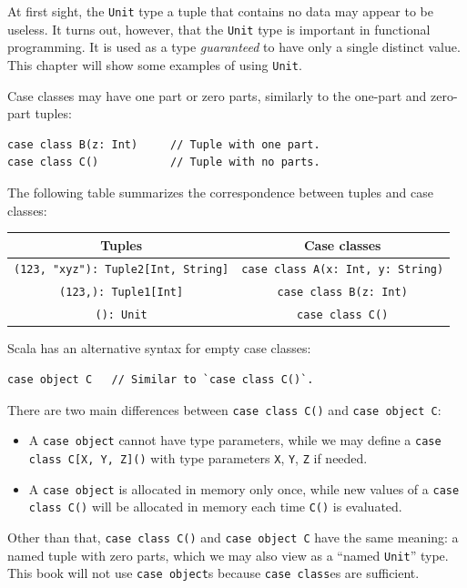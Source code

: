 At first sight, the \lstinline!Unit! type \textemdash{} a tuple that
contains no data \textemdash{} may appear to be useless. It turns
out, however, that the \lstinline!Unit! type is important in functional
programming. It is used as a type \emph{guaranteed} to have only a
single distinct value. This chapter will show some examples of using
\lstinline!Unit!.

Case classes may have one part or zero parts, similarly to the one-part
and zero-part tuples:
\begin{lstlisting}
case class B(z: Int)     // Tuple with one part.
case class C()           // Tuple with no parts.
\end{lstlisting}

The following table summarizes the correspondence between tuples and
case classes:
\begin{center}
\begin{tabular}{|c|c|}
\hline 
\textbf{\small{}Tuples} & \textbf{\small{}Case classes}\tabularnewline
\hline 
\hline 
{\small{}}\lstinline!(123, "xyz"): Tuple2[Int, String]! & {\small{}}\lstinline!case class A(x: Int, y: String)!\tabularnewline
\hline 
{\small{}}\lstinline!(123,): Tuple1[Int]! & {\small{}}\lstinline!case class B(z: Int)!\tabularnewline
\hline 
{\small{}}\lstinline!(): Unit! & {\small{}}\lstinline!case class C()!\tabularnewline
\hline 
\end{tabular}
\par\end{center}

Scala has an alternative syntax for empty case classes:
\begin{lstlisting}
case object C   // Similar to `case class C()`.
\end{lstlisting}
There are two main differences between \lstinline!case class C()!
and \lstinline!case object C!:
\begin{itemize}
\item A \lstinline!case object! cannot have type parameters, while we may
define a \lstinline!case class C[X, Y, Z]()! with type parameters
\lstinline!X!, \lstinline!Y!, \lstinline!Z! if needed.
\item A \lstinline!case object! is allocated in memory only once, while
new values of a \lstinline!case class C()! will be allocated in memory
each time \lstinline!C()! is evaluated.
\end{itemize}
Other than that, \lstinline!case class C()! and \lstinline!case object C!
have the same meaning: a named tuple with zero parts, which we may
also view as a \textsf{``}named \lstinline!Unit!\textsf{''}
type. This book will not use \lstinline!case object!s because \lstinline!case class!es
are sufficient.

